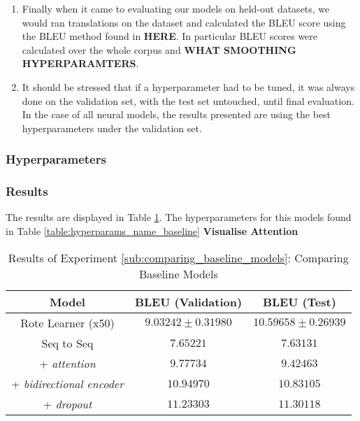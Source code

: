 \begin{enumerate}
    \item Finally when it came to evaluating our models on held-out datasets, we would ran translations on the dataset and calculated the BLEU score using the BLEU method found in \textbf{HERE}.
    In particular BLEU scores were calculated over the whole corpus and \textbf{WHAT SMOOTHING HYPERPARAMTERS}.
    \item It should be stressed that if a hyperparameter had to be tuned, it was always done on the validation set, with the test set untouched, until final evaluation. In the case of all neural models, the results presented are using the best hyperparameters under the validation set.

\end{enumerate}

\subsubsection{Hyperparameters}

\subsubsection{Results} %

The results are displayed in Table \ref{table:name_baseline}. The hyperparameters for this models found in Table \ref{table:hyperparams_name_baseline}
\textbf{Visualise Attention}

\begin{table}[h!]
\begin{center}
\begin{tabular}{ c | c | c }
    Model                            & BLEU (Validation)  & BLEU (Test)    \\
    \hline
    Rote Learner (x50)                & $ 9.03242 \pm  0.31980 $ & $ 10.59658 \pm 0.26939 $   \\
    \hline
    Seq to Seq                        & $ 7.65221 $  & $ 7.63131  $ \\
    + \textit{attention}              & $ 9.77734 $  & $ 9.42463  $ \\
    + \textit{bidirectional encoder}  & $ 10.94970 $ & $ 10.83105 $ \\
    + \textit{dropout}                & $ 11.23303 $ & $ 11.30118 $ \\
    \hline
\end{tabular}
\caption {Results of Experiment \ref{sub:comparing_baseline_models}: Comparing Baseline Models }
\label{table:name_baseline}
\end{center}
\end{table}



